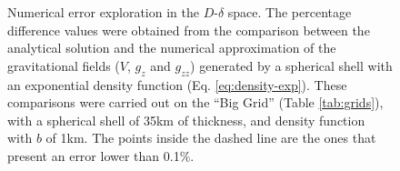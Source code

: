 \documentclass[extra, referee]{gji}
\begin{document}
\begin{figure}
\centering
{}
\caption{
    Numerical error exploration in the $D$-$\delta$ space.
    The percentage difference values were obtained from the comparison
    between the analytical solution and the numerical approximation of
    the gravitational fields ($V$, $g_z$ and $g_{zz}$) generated by a
    spherical shell with an exponential density function (Eq. \ref{eq:density-exp}).
    These comparisons were carried out on the ``Big Grid'' (Table
    \ref{tab:grids}), with a spherical shell of
    35km of thickness, and density function with $b$ of 1km.
    The points inside the dashed line are the ones that present an
    error lower than 0.1\%.
    }
\label{fig:grid-search}
\end{figure}
\end{document}
